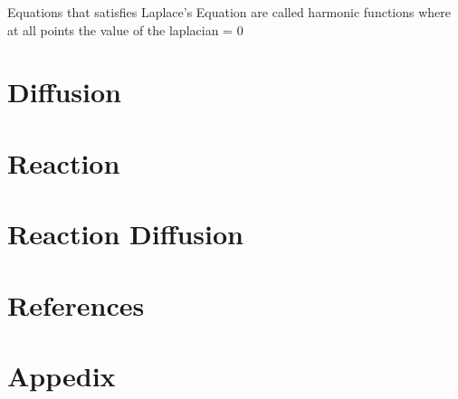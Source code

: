\documentclass[12pt]{article}
\begin{document}
Equations that satisfies Laplace's Equation are called harmonic functions where at all points the value of
the laplacian = 0 

\section{Diffusion}
\section{Reaction}
\section{Reaction Diffusion}
\section{References}


\newpage
\section{Appedix}



\end{document}
